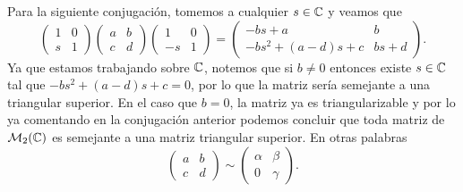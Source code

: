 Para la siguiente conjugación, tomemos a cualquier $s \in \mathbb{C}$ y veamos que
\begin{equation}
  \begin{pmatrix} 1 & 0 \\ s & 1 \end{pmatrix}
  \begin{pmatrix} a & b \\ c & d \end{pmatrix}
  \begin{pmatrix} 1 & 0 \\ -s & 1 \end{pmatrix}
    = \begin{pmatrix} -bs+a & b \\ -bs^2 + (a-d)s + c  & bs+d \end{pmatrix}. \label{eq:ConjII}
\end{equation}
Ya que estamos trabajando sobre $\mathbb{C}$, notemos que si $b \neq 0$ entonces existe $s \in \mathbb{C}$ tal que $-bs^2 + (a-d)s + c = 0$, por lo que la matriz sería semejante a una triangular superior. En el caso que $b = 0$, la matriz ya es triangularizable y por lo ya comentando en la conjugación anterior podemos concluir que toda matriz de $\mathcal{M}_2(\mathbb{C})$ es semejante a una matriz triangular superior. En otras palabras
\[ 
    \begin{pmatrix} a & b \\ c & d \end{pmatrix} \sim \begin{pmatrix} \alpha & \beta \\ 0 & \gamma \end{pmatrix}.
\]

